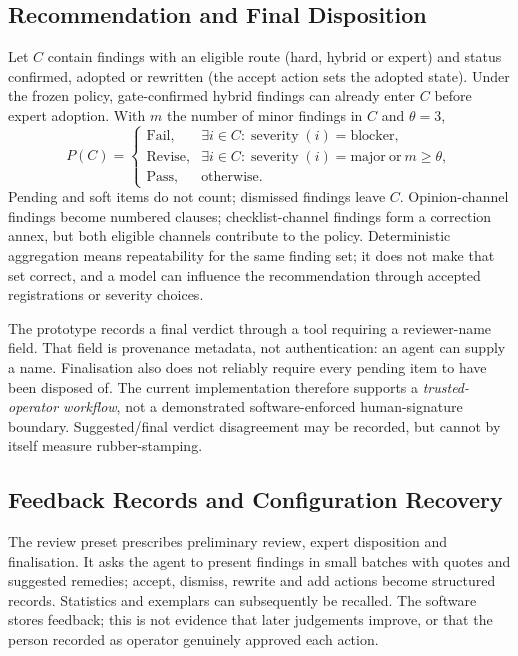 \documentclass[computers,article,submit,moreauthors]{Definitions/mdpi}
\begin{document}
\subsection{Recommendation and Final Disposition}\label{sec:policy}

Let $C$ contain findings with an eligible route (hard, hybrid or expert) and status confirmed, adopted or rewritten (the accept action sets the adopted state). Under the frozen policy, gate-confirmed hybrid findings can already enter $C$ before expert adoption. With $m$ the number of minor findings in $C$ and $\theta=3$,
\begin{equation*}
P(C)=\begin{cases}
\text{Fail},&\exists i\in C:\operatorname{severity}(i)=\text{blocker},\\
\text{Revise},&\exists i\in C:\operatorname{severity}(i)=\text{major}\ \text{or}\ m\ge\theta,\\
\text{Pass},&\text{otherwise}.
\end{cases}
\end{equation*}
Pending and soft items do not count; dismissed findings leave $C$. Opinion-channel findings become numbered clauses; checklist-channel findings form a correction annex, but both eligible channels contribute to the policy. Deterministic aggregation means repeatability for the same finding set; it does not make that set correct, and a model can influence the recommendation through accepted registrations or severity choices.

The prototype records a final verdict through a tool requiring a reviewer-name field. That field is provenance metadata, not authentication: an agent can supply a name. Finalisation also does not reliably require every pending item to have been disposed of. The current implementation therefore supports a \emph{trusted-operator workflow}, not a demonstrated software-enforced human-signature boundary. Suggested/final verdict disagreement may be recorded, but cannot by itself measure rubber-stamping.

\subsection{Feedback Records and Configuration Recovery}\label{sec:memory}\label{sec:feedback}

The review preset prescribes preliminary review, expert disposition and finalisation. It asks the agent to present findings in small batches with quotes and suggested remedies; accept, dismiss, rewrite and add actions become structured records. Statistics and exemplars can subsequently be recalled. The software stores feedback; this is not evidence that later judgements improve, or that the person recorded as operator genuinely approved each action.
\end{document}
